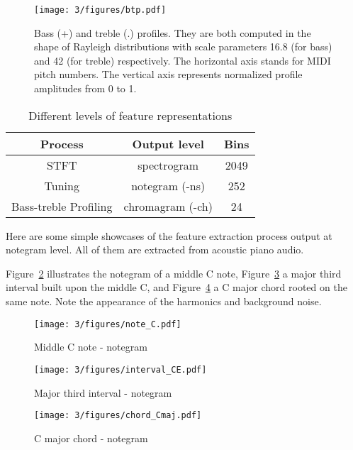 \begin{figure}[htb]
\centering
\texttt{[image: 3/figures/btp.pdf]}
\caption{Bass (+) and treble (.) profiles. They are both computed in the shape of Rayleigh distributions with scale parameters 16.8 (for bass) and 42 (for treble) respectively. The horizontal axis stands for MIDI pitch numbers. The vertical axis represents normalized profile amplitudes from 0 to 1.}
\label{fig:3-btprofile}
\end{figure}

\begin{table}[htb]
\caption{Different levels of feature representations}
\centering
\footnotesize
\begin{tabular}{|c|c|c|} \hline
 Process & Output level & Bins \\ \hline
 STFT & spectrogram & 2049 \\ \hline
 Tuning & notegram (-ns) & 252 \\ \hline
 Bass-treble Profiling & chromagram (-ch) & 24 \\ \hline
\end{tabular}
\label{tab:3-felevels}
\end{table}

Here are some simple showcases of the feature extraction process output at notegram level. All of them are extracted from acoustic piano audio.

Figure~\ref{fig:3-note_C} illustrates the notegram of a middle C note, Figure~\ref{fig:3-interval_CE} a major third interval built upon the middle C, and Figure~\ref{fig:3-chord_Cmaj} a C major chord rooted on the same note. Note the appearance of the harmonics and background noise.

\begin{figure}
\centering
\texttt{[image: 3/figures/note\_C.pdf]}
\caption{Middle C note - notegram}
\label{fig:3-note_C}
\end{figure}

\begin{figure}
\centering
\texttt{[image: 3/figures/interval\_CE.pdf]}
\caption{Major third interval - notegram}
\label{fig:3-interval_CE}
\end{figure}

\begin{figure}
\centering
\texttt{[image: 3/figures/chord\_Cmaj.pdf]}
\caption{C major chord - notegram}
\label{fig:3-chord_Cmaj}
\end{figure}

